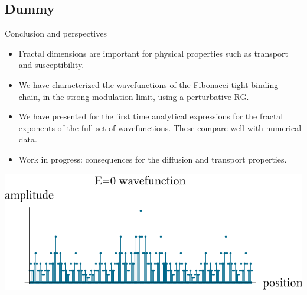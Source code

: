 \documentclass[xcolor=x11names,compress,professionalfonts]{beamer}
\renewcommand{\(}{\begin{columns}}
\renewcommand{\)}{\end{columns}}
\newcommand{\<}[1]{\begin{column}{#1}}
\renewcommand{\>}{\end{column}}
\begin{document}
\subsection{Dummy}
\begin{frame}{Conclusion and perspectives}
\begin{itemize}
	\item Fractal dimensions are important for physical properties such as transport and susceptibility.
	\item We have characterized the wavefunctions of the Fibonacci tight-binding chain, in the strong modulation limit, using a perturbative RG.
	\item We have presented for the first time analytical expressions for the fractal exponents of the full set of wavefunctions. These compare well with numerical data.
	\item Work in progress: consequences for the diffusion and transport properties.
\end{itemize}
	\centering
	\includegraphics[scale=.55]{E0_wavefunction.pdf}
\end{frame}
\end{document}
